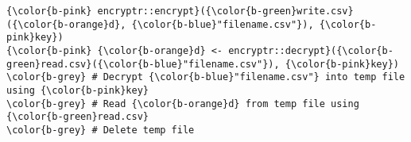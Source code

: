 \documentclass[class=minimal,border=0]{standalone}
\begin{document}
%
\begin{BVerbatim}[bgcolor=b-darkgrey]
{\color{b-pink} encryptr::encrypt}({\color{b-green}write.csv}({\color{b-orange}d}, {\color{b-blue}"filename.csv"}), {\color{b-pink}key})
{\color{b-pink} {\color{b-orange}d} <- encryptr::decrypt}({\color{b-green}read.csv}({\color{b-blue}"filename.csv"}), {\color{b-pink}key})
\color{b-grey} # Decrypt {\color{b-blue}"filename.csv"} into temp file using {\color{b-pink}key}
\color{b-grey} # Read {\color{b-orange}d} from temp file using {\color{b-green}read.csv} 
\color{b-grey} # Delete temp file
\end{BVerbatim}
\end{document}
